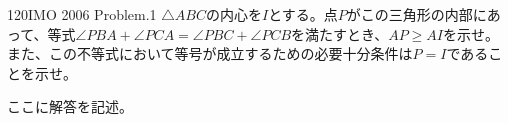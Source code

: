 \begin{prob}{120}{}{IMO 2006 Problem.1}
 $\triangle{ABC}$の内心を$I$とする。点$P$がこの三角形の内部にあって、等式$\angle{PBA}+\angle{PCA}=\angle{PBC}+\angle{PCB}$を満たすとき、$AP\ge AI$を示せ。また、この不等式において等号が成立するための必要十分条件は$P=I$であることを示せ。
\end{prob}

ここに解答を記述。